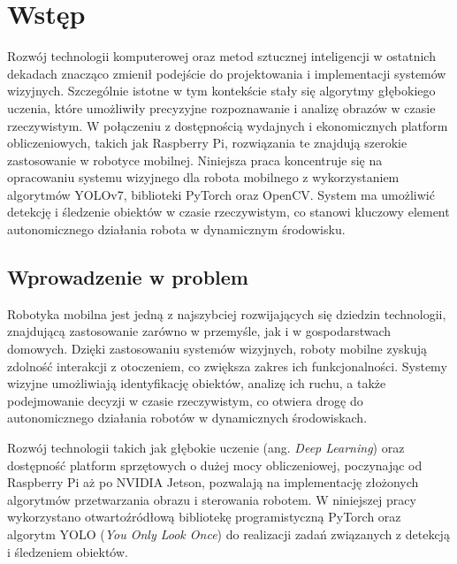 \documentclass[a4paper,twoside,12pt]{book}
\newcounter{stronyPozaNumeracja}
\begin{document}
\tableofcontents

\setcounter{stronyPozaNumeracja}{\value{page}}
\mainmatter
\pagestyle{empty}

\cleardoublepage

\pagestyle{NumeryStronNazwyRozdzialow}


\chapter{Wstęp}
\label{ch:wstep}

Rozwój technologii komputerowej oraz metod sztucznej inteligencji w ostatnich dekadach znacząco zmienił podejście do projektowania i implementacji systemów wizyjnych. Szczególnie istotne w tym kontekście stały się algorytmy głębokiego uczenia, które umożliwiły precyzyjne rozpoznawanie i analizę obrazów w czasie rzeczywistym. W połączeniu z dostępnością wydajnych i ekonomicznych platform obliczeniowych, takich jak Raspberry Pi, rozwiązania te znajdują szerokie zastosowanie w robotyce mobilnej. Niniejsza praca koncentruje się na opracowaniu systemu wizyjnego dla robota mobilnego z wykorzystaniem algorytmów YOLOv7, biblioteki PyTorch oraz OpenCV. System ma umożliwić detekcję i śledzenie obiektów w czasie rzeczywistym, co stanowi kluczowy element autonomicznego działania robota w dynamicznym środowisku.

\section{Wprowadzenie w problem}
Robotyka mobilna jest jedną z najszybciej rozwijających się dziedzin technologii, znajdującą zastosowanie zarówno w przemyśle, jak i w gospodarstwach domowych. Dzięki zastosowaniu systemów wizyjnych, roboty mobilne zyskują zdolność interakcji z otoczeniem, co zwiększa zakres ich funkcjonalności. Systemy wizyjne umożliwiają identyfikację obiektów, analizę ich ruchu, a także podejmowanie decyzji w czasie rzeczywistym, co otwiera drogę do autonomicznego działania robotów w dynamicznych środowiskach.

Rozwój technologii takich jak głębokie uczenie (ang. \textit{Deep Learning}) oraz dostępność platform sprzętowych o dużej mocy obliczeniowej, poczynając od Raspberry Pi aż po NVIDIA Jetson, pozwalają na implementację złożonych algorytmów przetwarzania obrazu i sterowania robotem. W niniejszej pracy wykorzystano otwartoźródłową bibliotekę programistyczną PyTorch oraz algorytm YOLO (\textit{You Only Look Once}) do realizacji zadań związanych z detekcją i śledzeniem obiektów.
\end{document}
